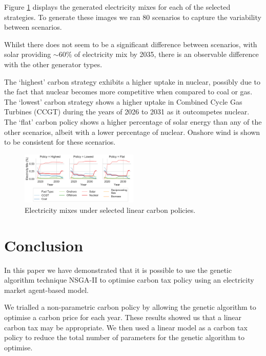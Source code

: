 \documentclass[sigconf]{acmart}
\begin{document}
Figure \ref{fig:best_electricity_mixes_facet} displays the generated electricity mixes for each of the selected strategies. To generate these images we ran 80 scenarios to capture the variability between scenarios. 

Whilst there does not seem to be a significant difference between scenarios, with solar providing ${\sim}60\%$ of electricity mix by 2035, there is an observable difference with the other generator types.

The `highest' carbon strategy exhibits a higher uptake in nuclear, possibly due to the fact that nuclear becomes more competitive when compared to coal or gas. The `lowest' carbon strategy shows a higher uptake in Combined Cycle Gas Turbines (CCGT) during the years of 2026 to 2031 as it outcompetes nuclear. The `flat' carbon policy shows a higher percentage of solar energy than any of the other scenarios, albeit with a lower percentage of nuclear. Onshore wind is shown to be consistent for these scenarios.

\begin{figure}
\centering
\includegraphics[width=0.50\textwidth]{figures/results/best_electricity_mixes_facet}
\caption{Electricity mixes under selected linear carbon policies.}
\label{fig:best_electricity_mixes_facet}
\end{figure}






\section{Conclusion}
\label{sec:conclusion}

In this paper we have demonstrated that it is possible to use the genetic algorithm technique NSGA-II to optimise carbon tax policy using an electricity market agent-based model. 

We trialled a non-parametric carbon policy by allowing the genetic algorithm to optimise a carbon price for each year. These results showed us that a linear carbon tax may be appropriate. We then used a linear model as a carbon tax policy to reduce the total number of parameters for the genetic algorithm to optimise.  
\end{document}
